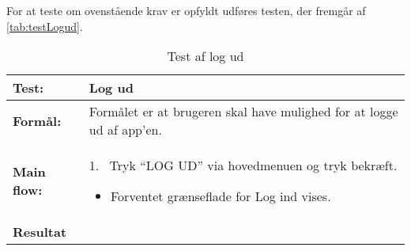\noindent
For at teste om ovenstående krav er opfyldt udføres testen, der fremgår af \autoref{tab:testLogud}.

\begin{table} [H]
	\centering
  \begin{tabular}{ | l | p{14cm} |} \hline
    \textbf{Test:} & Log ud \\ \hline
  \textbf{Formål:} & Formålet er at brugeren skal have mulighed for at logge ud af app’en.
 \\ \hline
 	\textbf{Main flow:} & 1.~ Tryk “LOG UD” via hovedmenuen og tryk bekræft.
 	\begin{itemize} [label={\checkmark}]
 	\item Forventet grænseflade for Log ind vises.
 	\end{itemize}	
\\ \hline
\textbf{Resultat} &\\ \hline
   \end{tabular}
   \caption{Test af log ud}
    \label{tab:testLogud}
\end{table}





